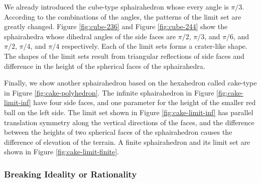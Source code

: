 We already introduced the cube-type sphairahedron whose every angle is
$\pi / 3$.
According to the combinations of the angles, the patterns of the limit
set are greatly changed.
Figure \ref{fig:cube-236} and Figure \ref{fig:cube-244} show the
sphairahedra whose dihedral angles of the side faces are
$\pi / 2$, $\pi / 3$, and $\pi / 6$,
and $\pi / 2$, $\pi / 4$, and $\pi / 4$ respectively.
Each of the limit sets forms a crater-like shape.
The shapes of the limit sets result from triangular reflections of side faces and
difference in the height of the spherical faces of the sphairahedra.

Finally, we show another sphairahedron based on the hexahedron
called cake-type in Figure \ref{fig:cake-polyhedron}.
The infinite sphairahedron in
Figure \ref{fig:cake-limit-inf}
have four side faces, and one parameter for the height of the smaller
red ball on the left side.
The limit set shown in
Figure \ref{fig:cake-limit-inf} has parallel
translation symmetry along the vertical directions of the faces, and the
difference between the heights of two spherical faces of the
sphairahedron causes the difference of elevation of the terrain.
A finite sphairahedron and its limit set are shown in Figure
\ref{fig:cake-limit-finite}.


\subsubsection{Breaking Ideality or Rationality}

